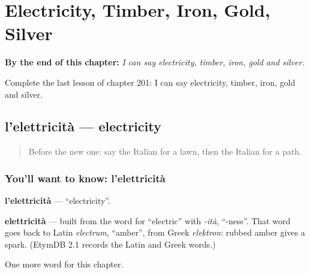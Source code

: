 
\chapter{Electricity, Timber, Iron, Gold, Silver}
\label{ch:it-electricity-timber-iron-gold-silver}

\begin{chapteropening}
\textbf{By the end of this chapter:} \emph{I can say electricity, timber, iron, gold and silver.}

Complete the last lesson of chapter 201: I can say electricity, timber, iron, gold and silver.
\end{chapteropening}

\section[l'elettricità]{l'elettricità — electricity}

\label{lesson:IT-C201-elettricita}



\begin{quote}
Before the new one: say the Italian for a lawn, then the Italian for a path.
\end{quote}

\subsection*{You'll want to know: l'elettricità}
\textbf{l'elettricità} — \textquotedblleft{}electricity\textquotedblright{}.

\begin{cousinweb}
\textbf{elettricità} — built from the word for \textquotedblleft{}electric\textquotedblright{} with \emph{-ità}, \textquotedblleft{}-ness\textquotedblright{}. That word goes back to Latin \emph{electrum}, \textquotedblleft{}amber\textquotedblright{}, from Greek \emph{elektron}: rubbed amber gives a spark. (EtymDB 2.1 records the Latin and Greek words.)
\end{cousinweb}

\begin{grammarlens}[title={What you've built}]
One more word for this chapter.
\end{grammarlens}


